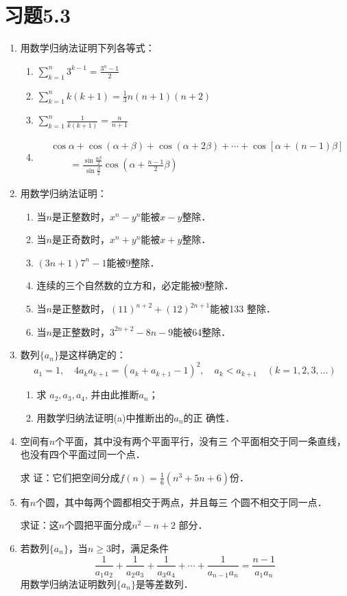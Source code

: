 \section*{习题5.3}
\begin{enumerate}
    \item 用数学归纳法证明下列各等式：
\begin{enumerate}
    \item $\displaystyle\sum^n_{k=1}3^{k-1}=\frac{3^n-1}{2}$
    \item $\displaystyle\sum^n_{k=1}k(k+1)=\frac{1}{3}n(n+1)(n+2)$
    \item $\displaystyle\sum^n_{k=1}\frac{1}{k(k+1)}=\frac{n}{n+1}$
    \item \[ \begin{split}
      & \cos\alpha+\cos(\alpha+\beta)+\cos(\alpha+2\beta)+\cdots+\cos[\alpha+(n-1)\beta]\\
      &\qquad =\frac{\sin\frac{n\beta}{2}}{\sin\frac{\beta}{2}}\cos\left(\alpha+\frac{n-1}{2}\beta\right)
    \end{split}\]
\end{enumerate}

\item 用数学归纳法证明：
\begin{enumerate}
\item 当$n$是正整数时，$x^n-y^n$能被$x-y$整除．
\item 当$n$是正奇数时，$x^n+y^n$能被$x+y$整除．
\item $(3n+1)7^n-1$能被9整除．
\item 连续的三个自然数的立方和，必定能被9整除．
\item 当$n$是正整数时，$(11)^{n+2}+(12)^{2n+1}$能被133
整除．
\item 当$n$是正整数时，$3^{2n+2}-8n-9$能被64整除．
\end{enumerate}

\item 数列$\{a_n\}$是这样确定的：
\[a_1=1,\quad 4a_ka_{k+1}=(a_k+a_{k+1}-1)^2,\quad a_k<a_{k+1}\quad (k=1,2,3,\ldots)\]
\begin{enumerate}
    \item 求 $a_2,a_3,a_4$, 并由此推断$a_n$；
    \item 用数学归纳法证明(a)中推断出的$a_n$的正
确性．
\end{enumerate}

\item 空间有$n$个平面，其中没有两个平面平行，没有三
个平面相交于同一条直线，也没有四个平面过同一个点．

求
证：它们把空间分成$f(n)=\frac{1}{6}
(n^3+5n+6)$份．
\item 有$n$个圆，其中每两个圆都相交于两点，并且每三
个圆不相交于同一点．

求证：这$n$个圆把平面分成$n^2-n+2$
部分．

\item 若数列$\{a_n\}$，当$n\ge 3$时，满足条件
\[\frac{1}{a_1a_2}+\frac{1}{a_2a_3}+\frac{1}{a_3a_4}+\cdots+\frac{1}{a_{n-1}a_n}=\frac{n-1}{a_1a_n}\]
用数学归纳法证明数列$\{a_n\}$是等差数列．
\end{enumerate}
